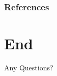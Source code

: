 \documentclass
		[
			xcolor = table,			%
			usenames,			%
			dvipsnames,			%
			svgnames,			%
			x11names				%
			final
		]{beamer}					%
\begin{document}


	
	
	

	

	
	
\subsection*{}
 \begin{frame}[t, allowframebreaks]
    \frametitle{References}
    \printbibliography
\end{frame}

\section*{End}

 \begin{frame}
\Huge{\centerline{Any Questions?}}
\end{frame}

\end{document}
